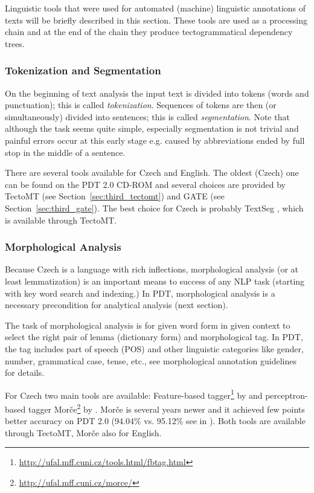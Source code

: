 Linguistic tools that were used for automated (machine) linguistic annotations of texts will be briefly described in this section. These tools are used as a processing chain and at the end of the chain they produce tectogrammatical dependency trees. 


 
\subsubsection{Tokenization and Segmentation} 
On the beginning of text analysis the input text is divided into tokens (words and punctuation); this is called \emph{tokenization}. Sequences of tokens are then (or simultaneously) divided into sentences; this is called \emph{segmentation}. Note that although the task seems quite simple, especially segmentation is not trivial and painful errors occur at this early stage e.g. caused by abbreviations ended by full stop in the middle of a sentence.

There are several tools available for Czech and English. The oldest (Czech) one can be found on the PDT 2.0 CD-ROM \cite{biblio:PDT20_CD} and several choices are provided by TectoMT (see Section~\ref{sec:third_tectomt}) and GATE (see Section~\ref{sec:third_gate}). The best choice for Czech is probably TextSeg \citep{TextSeg}, which is available through TectoMT.


		
\subsubsection{Morphological Analysis}

Because Czech is a language with rich inflections, morphological analysis (or at least lemmatization) is an important means to success of any NLP task (starting with key word search and indexing.) In PDT, morphological analysis is a necessary precondition for analytical analysis (next section).

The task of morphological analysis is for given word form in given context to select the right pair of lemma (dictionary form) and morphological tag. In PDT, the tag includes part of speech (POS) and other linguistic categories like gender, number, grammatical case, tense, etc., see morphological annotation guidelines for details.

For Czech two main tools are available: Feature-based tagger\footnote{\url{http://ufal.mff.cuni.cz/tools.html/fbtag.html}} by \cite{biblio:HajicMorfTag} and perceptron-based tagger Morče\footnote{\url{http://ufal.mff.cuni.cz/morce/}} by \cite{biblio:VoMorphologicalTagging2006}. Morče is several years newer and it achieved few points better accuracy on PDT 2.0 (94.04\% vs. 95.12\% see in \citep{Spoustova07b}). Both tools are available through TectoMT, Morče also for English.

